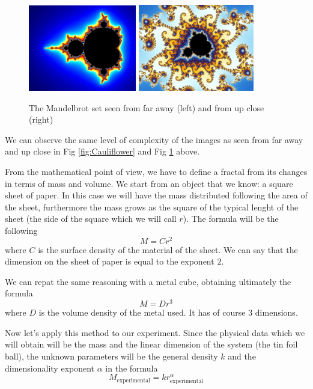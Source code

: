 \documentclass[a4paper,12pt]{article}
\begin{document}
\begin{figure}[h]
    \centering
    \begin{minipage}{1\textwidth}
        \centering
        \includegraphics[width = 0.42\textwidth]{Mandelbrot_far.jpg}
        \includegraphics[width = 0.45\textwidth]{Mandelbrot_close.jpg}
    \end{minipage}
    \caption{The Mandelbrot set seen from far away (left) and from up close (right)}
    \label{fig:Mandelbrot}
\end{figure}

We can observe the same level of complexity of the images as seen from far away 
and up close in Fig \ref{fig:Cauliflower} and Fig \ref{fig:Mandelbrot} above.

From the mathematical point of view, we have to define a fractal from its changes 
in terms of mass and volume. We start from an object that we know: a square sheet 
of paper. In this case we will have the mass distributed following the area of 
the sheet, furthermore the mass grows as the square of the typical lenght of the 
sheet (the side of the square which we will call $r$). The formula will be the 
following 
\[ M = C r^2 \]
where $C$ is the surface density of the material of the sheet. We can say that the 
dimension on the sheet of paper is equal to the exponent $2$.

We can repat the same reasoning with a metal cube, obtaining ultimately the formula
\[ M = D r^3 \]
where $D$ is the volume density of the metal used. It has of course $3$ dimensions.

Now let's apply this method to our experiment. Since the physical data which we 
will obtain will be the mass and the linear dimension of the system 
(the tin foil ball), the unknown parameters will be the general density $k$ and 
the dimensionality exponent $\alpha$ in the formula
\begin{equation} 
    M_{\text{experimental}} = k r_{\text{experimental}}^{\alpha}
    \label{eq:gen_fractal}
\end{equation}   
\end{document}
